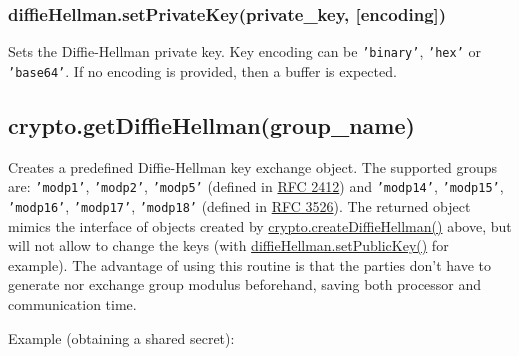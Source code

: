 \subsubsection{diffieHellman.setPrivateKey(private\_key,
{[}encoding{]})}\label{diffiehellman.setprivatekeyprivateux5fkey-encoding}

Sets the Diffie-Hellman private key. Key encoding can be
\texttt{'binary'}, \texttt{'hex'} or \texttt{'base64'}. If no encoding
is provided, then a buffer is expected.

\subsection{crypto.getDiffieHellman(group\_name)}\label{crypto.getdiffiehellmangroupux5fname}

Creates a predefined Diffie-Hellman key exchange object. The supported
groups are: \texttt{'modp1'}, \texttt{'modp2'}, \texttt{'modp5'}
(defined in \href{http://www.rfc-editor.org/rfc/rfc2412.txt}{RFC 2412})
and \texttt{'modp14'}, \texttt{'modp15'}, \texttt{'modp16'},
\texttt{'modp17'}, \texttt{'modp18'} (defined in
\href{http://www.rfc-editor.org/rfc/rfc3526.txt}{RFC 3526}). The
returned object mimics the interface of objects created by
\hyperref[cryptoux5fcryptoux5fcreatediffiehellmanux5fprimeux5fencoding]{crypto.createDiffieHellman()}
above, but will not allow to change the keys (with
\hyperref[cryptoux5fdiffiehellmanux5fsetpublickeyux5fpublicux5fkeyux5fencoding]{diffieHellman.setPublicKey()}
for example). The advantage of using this routine is that the parties
don't have to generate nor exchange group modulus beforehand, saving
both processor and communication time.

Example (obtaining a shared secret):

